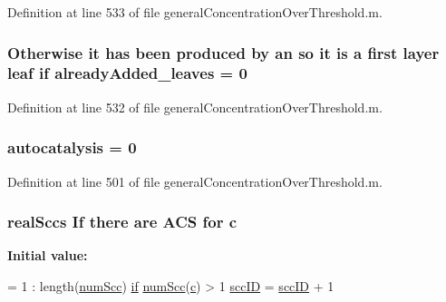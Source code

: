 Definition at line 533 of file general\-Concentration\-Over\-Threshold.\-m.

\hypertarget{a00028_aabbdc56dad7f3314f69a712de710352c}{
\subsubsection[{already\-Added\-\_\-leaves}]{ Otherwise it has been produced by an so it is {\bf a} first layer leaf {\bf if} already\-Added\-\_\-leaves = 0}}\label{a00028_aabbdc56dad7f3314f69a712de710352c}


Definition at line 532 of file general\-Concentration\-Over\-Threshold.\-m.

\hypertarget{a00028_a2d0b5f62c8a18e8cbfeb15c6f8856c5a}{
\subsubsection[{autocatalysis}]{\setlength{\rightskip}{0pt plus 5cm}autocatalysis = 0}}\label{a00028_a2d0b5f62c8a18e8cbfeb15c6f8856c5a}


Definition at line 501 of file general\-Concentration\-Over\-Threshold.\-m.

\hypertarget{a00028_a0f16b7d4c8c225e06e6a8b2081508e64}{
\subsubsection[{c}]{ {\bf real\-Sccs} If there are {\bf A\-C\-S} for c}}\label{a00028_a0f16b7d4c8c225e06e6a8b2081508e64}
{\bfseries Initial value\-:}
\begin{DoxyCode}
= 1 : length(\hyperlink{a00028_a0d0db21d4520f7561ff56e2c80e4fb69}{numScc})
                \hyperlink{a00025_adf3394dfd4755fd0ef2854fe558ff8aa}{if} \hyperlink{a00028_a0d0db21d4520f7561ff56e2c80e4fb69}{numScc}(\hyperlink{a00027_a8e54ca14679a1ce9245a3b7d55d95570}{c}) > 1
                    \hyperlink{a00028_a85ff953f350ff6660d5f3489e31d57b6}{sccID} = \hyperlink{a00028_a85ff953f350ff6660d5f3489e31d57b6}{sccID} + 1
\end{DoxyCode}


